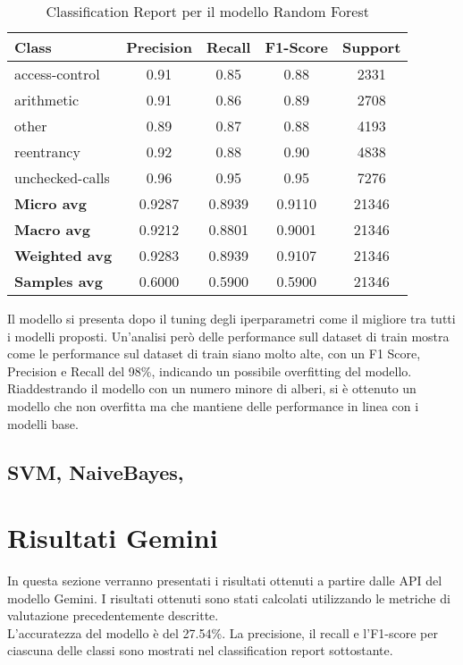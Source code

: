 \documentclass[../../Thesis.tex]{subfiles}
\begin{document}
\begin{table}[H]
    \centering
    \small
    \begin{tabular}{lcccc}
    \hline
    \textbf{Class} & \textbf{Precision} & \textbf{Recall} & \textbf{F1-Score} & \textbf{Support} \\
    \hline
    access-control & 0.91 & 0.85 & 0.88 & 2331 \\
    arithmetic & 0.91 & 0.86 & 0.89 & 2708 \\
    other & 0.89 & 0.87 & 0.88 & 4193 \\
    reentrancy & 0.92 & 0.88 & 0.90 & 4838 \\
    unchecked-calls & 0.96 & 0.95 & 0.95 & 7276 \\
    \hline
    \textbf{Micro avg} & 0.9287 & 0.8939 & 0.9110 & 21346 \\
    \textbf{Macro avg} & 0.9212 & 0.8801 & 0.9001 & 21346 \\
    \textbf{Weighted avg} & 0.9283 & 0.8939 & 0.9107 & 21346 \\
    \textbf{Samples avg} & 0.6000 & 0.5900 & 0.5900 & 21346 \\
    \hline
    \end{tabular}
    \caption{Classification Report per il modello Random Forest}
\end{table}
Il modello si presenta dopo il tuning degli iperparametri come il migliore tra tutti i modelli proposti. Un'analisi però delle performance sull dataset di train mostra come le performance sul dataset di train siano molto alte, con un F1 Score, Precision e Recall del 98\%, indicando un possibile overfitting del modello.\\
Riaddestrando il modello con un numero minore di alberi, si è ottenuto un modello che non overfitta ma che mantiene delle performance in linea con i modelli base.\\ 

\subsection{SVM, NaiveBayes, }

\section{Risultati Gemini}

In questa sezione verranno presentati i risultati ottenuti a partire dalle API del modello Gemini. I risultati ottenuti sono stati calcolati utilizzando le metriche di valutazione precedentemente descritte.\\
L'accuratezza del modello è del 27.54\%. La precisione, il recall e l'F1-score per ciascuna delle classi sono mostrati nel classification report sottostante.
\end{document}
